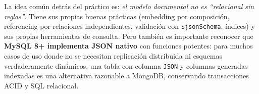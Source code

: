 \documentclass[11pt,a4paper]{article}
\begin{document}
La idea común detrás del práctico es: \emph{el modelo documental no es ``relacional sin reglas''}. Tiene sus propias buenas prácticas (embedding por composición, referencing por relaciones independientes, validación con \texttt{\$jsonSchema}, índices) y sus propias herramientas de consulta. Pero también es importante reconocer que \textbf{MySQL 8+ implementa JSON nativo} con funciones potentes: para muchos casos de uso donde no se necesitan replicación distribuida ni esquemas verdaderamente dinámicos, una tabla con columna \texttt{JSON} y columnas generadas indexadas es una alternativa razonable a MongoDB, conservando transacciones ACID y SQL relacional.
\end{document}
